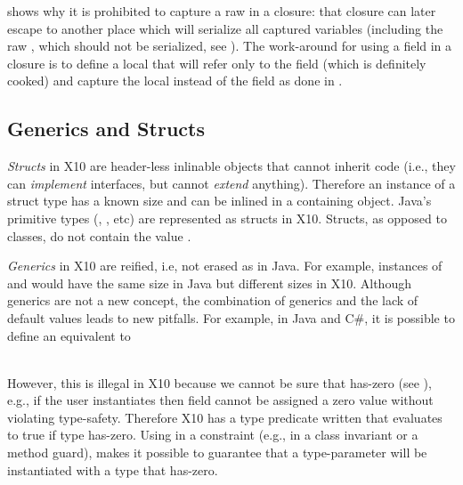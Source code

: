  shows why it is prohibited to capture a raw \this in a closure:
    that closure can later escape to another place which will serialize all captured variables
    (including the raw \this, which should not be serialized, see ).
The work-around for using a field in a closure is to define a local that will refer only to the field (which is definitely cooked)
    and capture the local instead of the field as done in .



\subsection{Generics and Structs}
\label{Section:Generics-and-Structs}
\emph{Structs} in X10 are header-less inlinable objects
    that cannot inherit code (i.e., they can \emph{implement} interfaces, but cannot \emph{extend} anything).
Therefore an instance of a struct type has a known size and can be inlined in a containing object.
Java's primitive types (, , etc) are represented as structs in X10.
Structs, as opposed to classes, do not contain the value .

\emph{Generics} in X10 are reified, i.e, not erased as in Java.
For example, instances of  and 
    would have the same size in Java but different sizes in X10.
Although generics are not a new concept,
    the combination of generics and the lack of default values
    leads to new pitfalls.
For example, in Java and C\#, it is possible to define an equivalent to

~~~~~~~\\
However, this is illegal in X10 because we cannot be sure that  has-zero (see ),
    e.g., if the user instantiates  then field  cannot be assigned a zero value
    without violating type-safety.
Therefore X10 has a type predicate written  that evaluates to true if type  has-zero.
Using  in a constraint (e.g., in a class invariant or a method guard),
    makes it possible to guarantee that a type-parameter will be instantiated with a type that has-zero.

